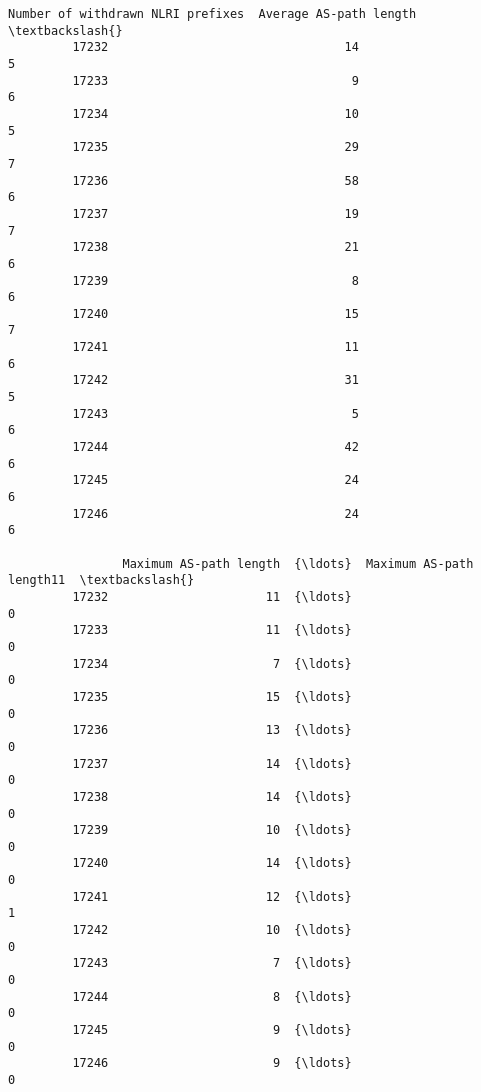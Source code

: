 \documentclass[11pt]{article}
\begin{document}
\begin{Verbatim}[commandchars=\\\{\}]
                Number of withdrawn NLRI prefixes  Average AS-path length  \textbackslash{}
         17232                                 14                       5   
         17233                                  9                       6   
         17234                                 10                       5   
         17235                                 29                       7   
         17236                                 58                       6   
         17237                                 19                       7   
         17238                                 21                       6   
         17239                                  8                       6   
         17240                                 15                       7   
         17241                                 11                       6   
         17242                                 31                       5   
         17243                                  5                       6   
         17244                                 42                       6   
         17245                                 24                       6   
         17246                                 24                       6   
         
                Maximum AS-path length  {\ldots}  Maximum AS-path length11  \textbackslash{}
         17232                      11  {\ldots}                         0   
         17233                      11  {\ldots}                         0   
         17234                       7  {\ldots}                         0   
         17235                      15  {\ldots}                         0   
         17236                      13  {\ldots}                         0   
         17237                      14  {\ldots}                         0   
         17238                      14  {\ldots}                         0   
         17239                      10  {\ldots}                         0   
         17240                      14  {\ldots}                         0   
         17241                      12  {\ldots}                         1   
         17242                      10  {\ldots}                         0   
         17243                       7  {\ldots}                         0   
         17244                       8  {\ldots}                         0   
         17245                       9  {\ldots}                         0   
         17246                       9  {\ldots}                         0   
         

\end{Verbatim}
\end{document}
